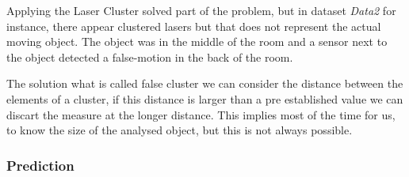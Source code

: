 \documentclass{article}
\begin{document}
Applying the Laser Cluster solved part of the problem, but in dataset \emph{Data2} for instance, there appear clustered lasers but that does not represent the actual moving object. The object was in the middle of the room and a sensor next to the object detected a false-motion in the back of the room.

The solution what is called false cluster we can consider the distance between the elements of a cluster, if this distance is larger than a pre established value we can discart the measure at the longer distance. This implies most of the time for us, to know the size of the analysed object, but this is not always possible.

\subsubsection{Prediction}
\end{document}
